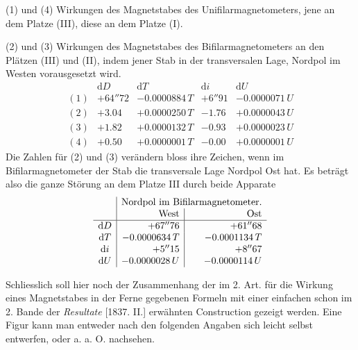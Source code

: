 (1) und (4) Wirkungen des Magnetstabes des Unifilarmagnetometers, jene an dem Platze (III), diese an dem Platze (I).

(2) und (3) Wirkungen des Magnetstabes des Bifilarmagnetometers an den Plätzen (III) und (II), indem jener Stab in der transversalen Lage, Nordpol im Westen vorausgesetzt wird.
\[
\begin{array}{c|r|r|r|r}
&\mathrm{d}D&\mathrm{d}T&\mathrm{d}i&\mathrm{d}U\\\hline
(1)&+64''72&-0.0000884\,T&+6''91&-0.0000071\,U\\
(2)&+3.04&+0.0000250\,T&-1.76&+0.0000043\,U\\
(3)&+1.82&+0.0000132\,T&-0.93&+0.0000023\,U\\
(4)&+0.50&+0.0000001\,T&-0.00&+0.0000001\,U
\end{array}
\]
Die Zahlen für (2) und (3) verändern bloss ihre Zeichen, wenn im Bifilarmagnetometer der Stab die transversale Lage Nordpol Ost hat. Es beträgt also die ganze Störung an dem Platze III durch beide Apparate
\[
\begin{array}{c|r|r}
&\multicolumn{2}{c}{\text{Nordpol im Bifilarmagnetometer.}}\\
&\text{West}&\text{Ost}\\\hline
\mathrm{d}D&+67''76&+61''68\\
\mathrm{d}T&-0.0000634\,T&-0.0001134\,T\\
\mathrm{d}i&+5''15&+8''67\\
\mathrm{d}U&-0.0000028\,U&-0.0000114\,U
\end{array}
\]

Schliesslich soll hier noch der Zusammenhang der im 2. Art. für die Wirkung eines Magnetstabes in der Ferne gegebenen Formeln mit einer einfachen schon im 2. Bande der \textit{Resultate} [1837. II.] erwähnten Construction gezeigt werden. Eine Figur kann man entweder nach den folgenden Angaben sich leicht selbst entwerfen, oder a. a. O. nachsehen.

